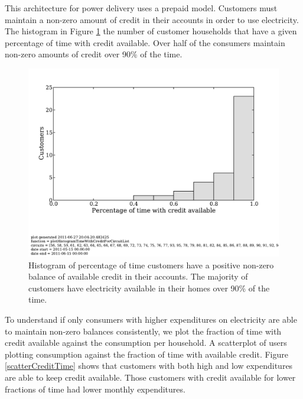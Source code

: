 \documentclass{sig-alternate}
\begin{document}

This architecture for power delivery uses a prepaid model.
Customers must maintain a non-zero amount of credit in their accounts in order
to use electricity.
The histogram in Figure \ref{creditHistogram} the number of customer households
that have a given percentage of time with credit available.
Over half of the consumers maintain non-zero amounts of credit over 90\% of
the time.


\begin{figure}[]
\begin{center}
\includegraphics[trim = 0in 1.3in 0in 0in, clip, width=\columnwidth]
                {figures/creditHistogram.pdf}
\end{center}
\caption{Histogram of percentage of time customers have a positive non-zero balance
of available credit in their accounts.  The majority of customers have electricity
available in their homes over 90\% of the time.}
\label{creditHistogram}
\end{figure}

To understand if only consumers with higher expenditures on electricity
are able to maintain non-zero balances consistently, we plot the fraction of
time with credit available against the consumption per household.
A scatterplot of users plotting consumption against the fraction of time with
available credit.
Figure \ref{scatterCreditTime}
shows that customers with both high and low expenditures are able
to keep credit available.
Those customers with credit available for lower fractions of time had lower
monthly expenditures.
\end{document}

